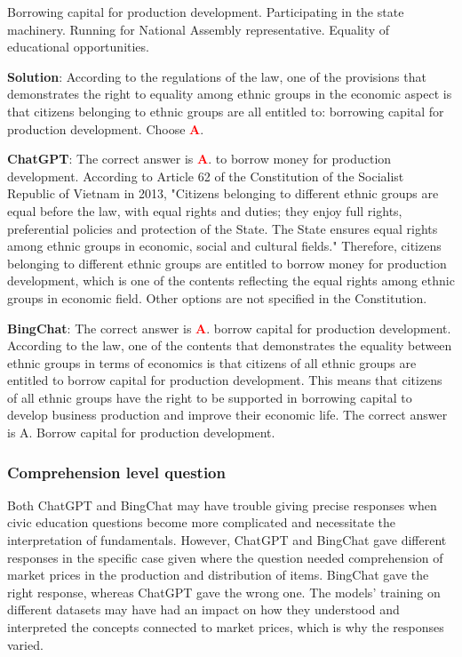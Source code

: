 \documentclass{article}
\begin{document}
{\begin{mdframed}[linewidth=1pt,linecolor=red]
		\begin{choices}
			\choice Borrowing capital for production development.
			\choice Participating in the state machinery.
			\choice Running for National Assembly representative.
			\choice Equality of educational opportunities.
		\end{choices}
		
		\textbf{Solution}: According to the regulations of the law, one of the provisions that demonstrates the right to equality among ethnic groups in the economic aspect is that citizens belonging to ethnic groups are all entitled to: borrowing capital for production development. Choose \textcolor{red}{\textbf{A}}.
		
		\textbf{ChatGPT}: The correct answer is \textcolor{red}{\textbf{A}}. to borrow money for production development. According to Article 62 of the Constitution of the Socialist Republic of Vietnam in 2013, "Citizens belonging to different ethnic groups are equal before the law, with equal rights and duties; they enjoy full rights, preferential policies and protection of the State. The State ensures equal rights among ethnic groups in economic, social and cultural fields." Therefore, citizens belonging to different ethnic groups are entitled to borrow money for production development, which is one of the contents reflecting the equal rights among ethnic groups in economic field. Other options are not specified in the Constitution.
		
		\textbf{BingChat}: The correct answer is \textcolor{red}{\textbf{A}}. borrow capital for production development. According to the law, one of the contents that demonstrates the equality between ethnic groups in terms of economics is that citizens of all ethnic groups are entitled to borrow capital for production development. This means that citizens of all ethnic groups have the right to be supported in borrowing capital to develop business production and improve their economic life. The correct answer is A. Borrow capital for production development.
		
		
	\end{mdframed}	
	
	\subsubsection{Comprehension level question}
	\label{VNHSGE_Civ_C}
	
	Both ChatGPT and BingChat may have trouble giving precise responses when civic education questions become more complicated and necessitate the interpretation of fundamentals. However, ChatGPT and BingChat gave different responses in the specific case given where the question needed comprehension of market prices in the production and distribution of items. BingChat gave the right response, whereas ChatGPT gave the wrong one. The models' training on different datasets may have had an impact on how they understood and interpreted the concepts connected to market prices, which is why the responses varied.
	
}
\end{document}

